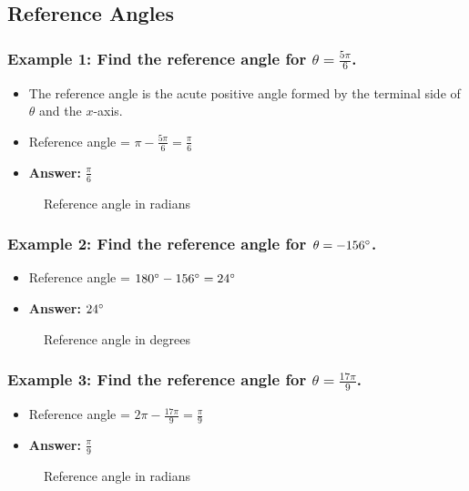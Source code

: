 \documentclass{article}
\begin{document}
\begin{paracol}{2}
\subsection{Reference Angles}
\subsubsection{Example 1: Find the reference angle for $\theta = \frac{5\pi}{6}$.}
\begin{itemize}
  \item The reference angle is the acute positive angle formed by the terminal
  side of $\theta$ and the $x$-axis.
  \item Reference angle = $\pi-\frac{5\pi}{6} = \frac{\pi}{6}$
  \item \textbf{Answer:} $\frac{\pi}{6}$
\end{itemize}\switchcolumn
\begin{figure}[H]
  \centering
  
  \caption{Reference angle in radians}
\end{figure}\switchcolumn*
\subsubsection{Example 2: Find the reference angle for $\theta = -156\degree$.}
\begin{itemize}
  \item Reference angle = $180\degree-156\degree = 24\degree$
  \item \textbf{Answer:} $24\degree$
\end{itemize}
\switchcolumn
\begin{figure}[H]
  \centering
  
  \caption{Reference angle in degrees}
\end{figure}
\switchcolumn
\flushpage
\subsubsection{Example 3: Find the reference angle for $\theta = \frac{17\pi}{9}$.}
\begin{itemize}
  \item Reference angle = $2\pi-\frac{17\pi}{9} = \frac{\pi}{9}$
  \item \textbf{Answer:} $\frac{\pi}{9}$
\end{itemize}
\switchcolumn
\begin{figure}[H]
  \centering
  
  \caption{Reference angle in radians}
\end{figure}
\switchcolumn
\flushpage


\end{paracol}
\end{document}
